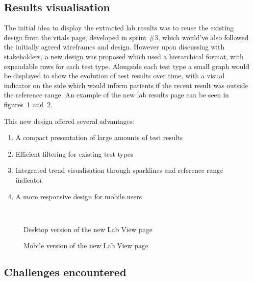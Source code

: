\subsection{Results visualisation}

The initial idea to display the extracted lab results was to reuse the existing design from the vitals page, developed in sprint \#3, which would've also followed the initially agreed wireframes and design. However upon discussing with stakeholders, a new design was proposed which used a hierarchical format, with expandable rows for each test type. Alongside each test type a small graph would be displayed to show the evolution of test results over time, with a visual indicator on the side which would inform patients if the recent result was outside the reference range. An example of the new lab results page can be seen in figures~\ref{fig:labs_page} and~\ref{fig:labs_page_mobile}.

This new design offered several advantages:

\begin{enumerate}
  \item A compact presentation of large amounts of test results
  \item Efficient filtering for existing test types
  \item Integrated trend visualisation through sparklines and reference range indicator
  \item A more responsive design for mobile users
\end{enumerate}

\begin{figure}[ht]
  \centering
  \\[\baselineskip]
  \caption{Desktop version of the new Lab View page}\label{fig:labs_page}
\end{figure}

\begin{figure}[ht]
  \centering
  \hfill
  \caption{Mobile version of the new Lab View page}\label{fig:labs_page_mobile}
\end{figure}

\subsection{Challenges encountered}

